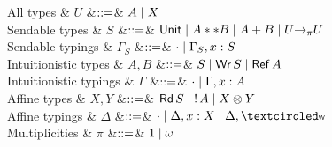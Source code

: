 \begin{figure*}[t]
  \begin{grammar}
    All types
    & $U$
    &$\mathrel{::=}$& $A \mathrel{\mid} X$
    \\
    Sendable types
    & $S$
    &$\mathrel{::=}$& $\text{\textsf{Unit}} \mathrel{\mid} A ** B \mathrel{\mid} {A} + {B} \mathrel{\mid} U
    {->}_{\pi} U$
    \\
    Sendable typings
    & ${\Gamma}_S$
    &$\mathrel{::=}$& $\cdot \mathrel{\mid} {\Gamma}_S,x:S$
    \\
    Intuitionistic types
    & $A,B$
    &$\mathrel{::=}$& $S \mathrel{\mid} \text{\textsf{Wr}}\,S \mathrel{\mid} \text{\textsf{Ref}}\,A$
    \\
    Intuitionistic typings
    & $\Gamma$
    &$\mathrel{::=}$& $\cdot \mathrel{\mid} \Gamma,x:A$
    \\
    Affine types
    & $X,Y$
    &$\mathrel{::=}$& $\text{\textsf{Rd}}\,S \mathrel{\mid} {!}\,{A} \mathrel{\mid}
    {X}\otimes{Y}$
    \\
    Affine typings
    & $\Delta$
    &$\mathrel{::=}$& $\emptyctxt \bnfalt \Delta,x:X \bnfalt \Delta, \wrtok$
    \\
    Multiplicities
    & $\pi$
    &$\mathrel{::=}$& $1 \mathrel{\mid} \omega$
  \end{grammar}
  \begin{comment}
  \begin{grammar}
    All types
    & $U$
    &$\bnfas$& $A \bnfalt X$
    \\    
    Sendable types
    & $S$
    &$\bnfas$& $\tyUnit \bnfalt \tyProd{A}{B} \bnfalt \tySum{A}{B} \bnfalt A ->
    B \bnfalt X \multimap Y$
    \\
    Sendable typings
    & ${\Gamma}_S$
    &$\bnfas$& $\emptyctxt \bnfalt {\Gamma}_S,x:S$
    \\
    Intuitionistic types
    & $A,B$
    &$\bnfas$& $S \bnfalt \tyWr{S} \bnfalt \tyRef{A}$
    \\
    Intuitionistic typings
    & $\Gamma$
    &$\bnfas$& $\emptyctxt \bnfalt \Gamma,x:A$
    \\

\end{comment}
\end{figure*}

